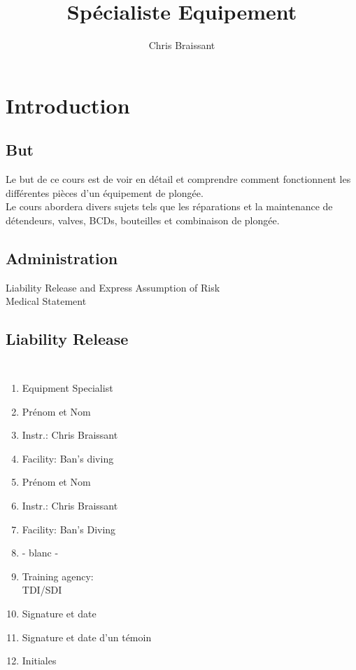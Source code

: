 \documentclass[aspectratio=1610,english,12pt]{beamer}
\author[]{Chris Braissant}
\title[]{Spécialiste Equipement}
\institute{Ban's Diving Resort}
\begin{document}
\begin{frame}[plain]
	\maketitle
\end{frame}

\section{Introduction}

\subsection{But}
\begin{frame}{\insertsubsection}
	Le but de ce cours est de voir en détail et comprendre comment fonctionnent les différentes pièces d'un équipement de plongée.\\
	Le cours abordera divers sujets tels que les réparations et la maintenance de détendeurs, valves, BCDs, bouteilles et combinaison de plongée.
\end{frame}

\subsection{Administration}
\begin{frame}{\insertsubsection}
	Liability Release and Express Assumption of Risk\\
	Medical Statement
\end{frame}

\subsection{Liability Release}
\begin{frame}{\insertsubsection}
	\begin{columns}[onlytextwidth]
			\begin{enumerate}\itemsep0em 
				\item Equipment Specialist
				\item Prénom et Nom
				\item Instr.: Chris Braissant
				\item Facility: Ban's diving
				\item Prénom et Nom
				\item Instr.: Chris Braissant
				\item Facility: Ban's Diving
				\item - blanc -
				\item Training agency:\\TDI/SDI
				\item Signature et date
				\item Signature et date d'un témoin
				\item Initiales
			\end{enumerate}
	\end{columns}
\end{frame}
\end{document}
